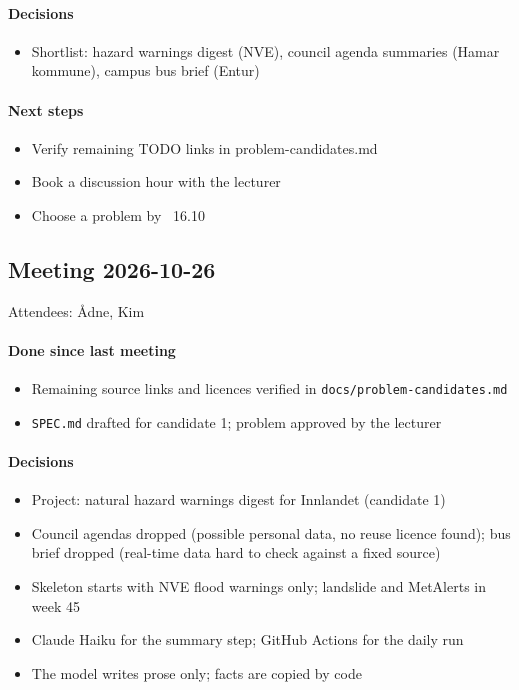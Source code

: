 \documentclass{article}
\newcommand{\code}[1]{\texttt{#1}}
\begin{document}
\paragraph{Decisions}
\begin{itemize}
\item Shortlist: hazard warnings digest (NVE), council agenda summaries (Hamar kommune), campus bus brief (Entur)
\end{itemize}
\paragraph{Next steps}
\begin{itemize}
\item Verify remaining TODO links in problem-candidates.md
\item Book a discussion hour with the lecturer
\item Choose a problem by ~16.10
\end{itemize}
\subsection*{Meeting 2026-10-26}
Attendees: Ådne, Kim

\paragraph{Done since last meeting}
\begin{itemize}
\item Remaining source links and licences verified in \code{docs/problem-candidates.md}
\item \code{SPEC.md} drafted for candidate 1; problem approved by the lecturer
\end{itemize}
\paragraph{Decisions}
\begin{itemize}
\item Project: natural hazard warnings digest for Innlandet (candidate 1)
\item Council agendas dropped (possible personal data, no reuse licence found); bus brief dropped (real-time data hard to check against a fixed source)
\item Skeleton starts with NVE flood warnings only; landslide and MetAlerts in week 45
\item Claude Haiku for the summary step; GitHub Actions for the daily run
\item The model writes prose only; facts are copied by code
\end{itemize}
\end{document}
